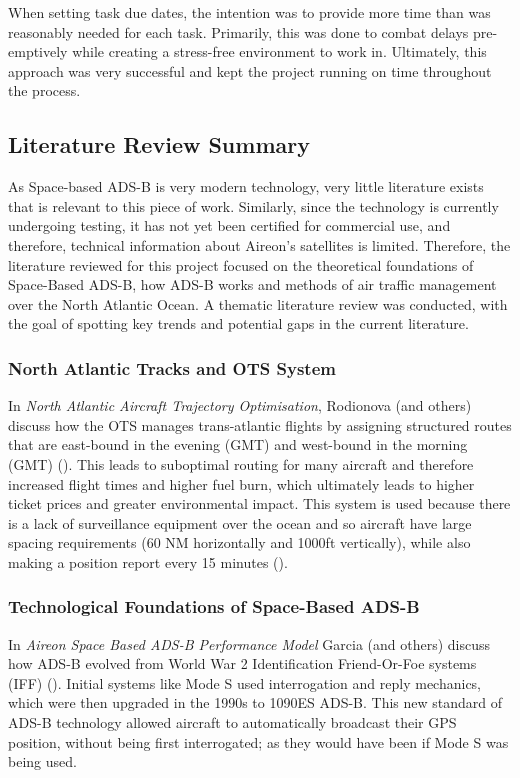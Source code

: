 \documentclass[stu, a4paper, 12pt, floatsintext]{apa7}
\numberwithin{figure}{section}
\numberwithin{table}{section}
\numberwithin{equation}{section}
\begin{document}
When setting task due dates, the intention was to provide more time than was reasonably needed for each task. Primarily, this was done to combat delays pre-emptively while creating a stress-free environment to work in. Ultimately, this approach was very successful and kept the project running on time throughout the process.
\subsection{Literature Review Summary}
As Space-based ADS-B is very modern technology, very little literature exists that is relevant to this piece of work. Similarly, since the technology is currently undergoing testing, it has not yet been certified for commercial use, and therefore, technical information about Aireon’s satellites is limited. Therefore, the literature reviewed for this project focused on the theoretical foundations of Space-Based ADS-B, how ADS-B works and methods of air traffic management over the North Atlantic Ocean. A thematic literature review was conducted, with the goal of spotting key trends and potential gaps in the current literature.
\subsubsection{North Atlantic Tracks and OTS System}
In \textit{North Atlantic Aircraft Trajectory Optimisation}, Rodionova (and others) discuss how the OTS manages trans-atlantic flights by assigning structured routes that are east-bound in the evening (GMT) and west-bound in the morning (GMT) (\cite{OTS}). This leads to suboptimal routing for many aircraft and therefore increased flight times and higher fuel burn, which ultimately leads to higher ticket prices and greater environmental impact. This system is used because there is a lack of surveillance equipment over the ocean and so aircraft have large spacing requirements (60 NM horizontally and 1000ft vertically), while also making a position report every 15 minutes (\cite{OTS}).
\subsubsection{Technological Foundations of Space-Based ADS-B}
In \textit{Aireon Space Based ADS-B Performance Model} Garcia (and others) discuss how ADS-B evolved from World War 2 Identification Friend-Or-Foe systems (IFF) (\cite{AireonSpaceBasedADSBPerformanceModel}). Initial systems like Mode S used interrogation and reply mechanics, which were then upgraded in the 1990s to 1090ES ADS-B. This new standard of ADS-B technology allowed aircraft to automatically broadcast their GPS position, without being first interrogated; as they would have been if Mode S was being used. 
\end{document}
